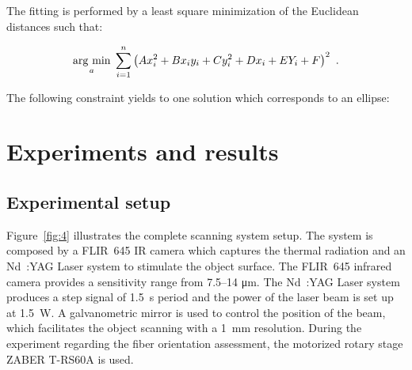 \documentclass[12pt]{spieman}
\begin{document}
\begin{spacing}{2}
The fitting is performed by a least square minimization of the Euclidean distances such that:

\begin{equation}
  \underset{a}{\operatorname{arg}\,\operatorname{min}}\; \sum_{i=1}^{n} \left( A x_i^2 + B x_i y_i + C y_i^2 + D x_i + E Y_i + F \right)^2 \ .
\end{equation}

The following constraint yields to one solution which corresponds to an ellipse:


% 
\graphicspath{ {./content/exp/figure/} }

\section{Experiments and results}\label{sec:4}

\subsection{Experimental setup}




Figure~\ref{fig:4} illustrates the complete scanning system setup. The system is composed by a FLIR~645 IR camera which captures the thermal radiation and an Nd~:YAG Laser system to stimulate the object surface. 
The FLIR~645 infrared camera provides a sensitivity range from \numrange{7.5}{14} \si{\micro \metre}.
The Nd~:YAG Laser system produces a step signal of \SI{1.5}{\second} period and the power of the laser beam is set up at \SI{1.5}{\watt}. 
A galvanometric mirror is used to control the position of the beam, which facilitates the object scanning with a \SI{1}{\milli \metre} resolution. 
During the experiment regarding the fiber orientation assessment, the motorized rotary stage ZABER T-RS60A is used.


\end{spacing}
\end{document}
